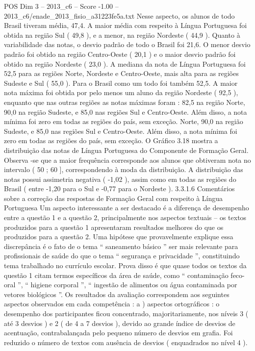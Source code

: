 \begin{textsample}{POS Dim 3 – 2013\_c6 – Score -1.00 – 2013\_c6/enade\_2013\_fisio\_a31223fe5a.txt}
Nesse aspecto, os alunos de todo Brasil tiveram média, 47,4.
A maior média com respeito à Língua Portuguesa foi obtida na região Sul ( 49,8 ), e a menor, na região Nordeste ( 44,9 ).
Quanto à variabilidade das notas, o desvio padrão de todo o Brasil foi 21,6.
O menor desvio padrão foi obtido na região Centro-Oeste ( 20,1 ) e o maior desvio padrão foi obtido na região Nordeste ( 23,0 ).
A mediana da nota de Língua Portuguesa foi 52,5 para as regiões Norte, Nordeste e Centro-Oeste, mais alta para as regiões Sudeste e Sul ( 55,0 ).
Para o Brasil como um todo foi também 52,5.
A maior nota máxima foi obtida por pelo menos um aluno da região Nordeste ( 92,5 ), enquanto que nas outras regiões as notas máximas foram : 82,5 na região Norte, 90,0 na região Sudeste, e 85,0 nas regiões Sul e Centro-Oeste.
Além disso, a nota mínima foi zero em todas as regiões do país, sem exceção.
Norte, 90,0 na região Sudeste, e 85,0 nas regiões Sul e Centro-Oeste.
Além disso, a nota mínima foi zero em todas as regiões do país, sem exceção.
O Gráfico 3.18 mostra a distribuição das notas de Língua Portuguesa do Componente de Formação Geral.
Observa -se que a maior frequência corresponde aos alunos que obtiveram nota no intervalo ( 50 ; 60 ], correspondendo à moda da distribuição.
A distribuição das notas possui assimetria negativa ( -1,02 ), assim como em todas as regiões do Brasil ( entre -1,20 para o Sul e -0,77 para o Nordeste ). 3.3.1.6 Comentários sobre a correção das respostas de Formação Geral com respeito à Língua Portuguesa Um aspecto interessante a ser destacado é a diferença de desempenho entre a questão 1 e a questão 2, principalmente nos aspectos textuais – os textos produzidos para a questão 1 apresentaram resultados melhores do que os produzidos para a questão 2.
Uma hipótese que provavelmente explique essa discrepância é o fato de o tema “ saneamento básico ” ser mais relevante para profissionais de saúde do que o tema “ segurança e privacidade ”, constituindo tema trabalhado no currículo escolar.
Prova disso é que quase todos os textos da questão 1 citam termos específicos da área de saúde, como “ contaminação feco-oral ”, “ higiene corporal ”, “ ingestão de alimentos ou água contaminada por vetores biológicos ”.
Os resultados da avaliação correspondem aos seguintes aspectos observados em cada competência : a ) aspectos ortográficos : o desempenho dos participantes ficou concentrado, majoritariamente, nos níveis 3 ( até 3 desvios ) e 2 ( de 4 a 7 desvios ), devido ao grande índice de desvios de acentuação, contrabalançada pelo pequeno número de desvios em grafia.
Foi reduzido o número de textos com ausência de desvios ( enquadrados no nível 4 ).

\end{textsample}
